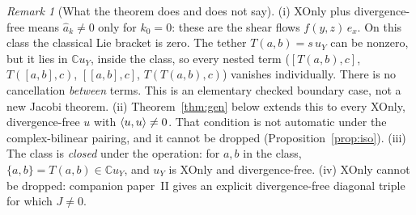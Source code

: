 \documentclass[11pt]{article}\emergencystretch=2em
\theoremstyle{definition}\newtheorem{definition}[theorem]{Definition}\theoremstyle{remark}\newtheorem{remark}[theorem]{Remark}
\begin{document}
\begin{remark}[What the theorem does and does not say]
(i) XOnly plus divergence-free means $\hat a_k\ne0$ only for $k_0=0$: these are the shear flows $f(y,z)\,e_x$. On this class the classical Lie bracket is zero. The tether $T(a,b)=s\,u_Y$ can be nonzero, but it lies in $\mathbb C u_Y$, inside the class, so every nested term ($[T(a,b),c]$, $T([a,b],c)$, $[[a,b],c]$, $T(T(a,b),c)$) vanishes individually. There is no cancellation \emph{between} terms. This is an elementary checked boundary case, not a new Jacobi theorem.
(ii) Theorem~\ref{thm:gen} below extends this to every XOnly, divergence-free $u$ with $\langle u,u\rangle\ne0$. That condition is not automatic under the complex-bilinear pairing, and it cannot be dropped (Proposition~\ref{prop:iso}).
(iii) The class is \emph{closed} under the operation: for $a,b$ in the class, $\{a,b\}=T(a,b)\in\mathbb C u_Y$, and $u_Y$ is XOnly and divergence-free.
(iv) XOnly cannot be dropped: companion paper~II gives an explicit divergence-free diagonal triple for which $J\ne0$.
\end{remark}
\end{document}
